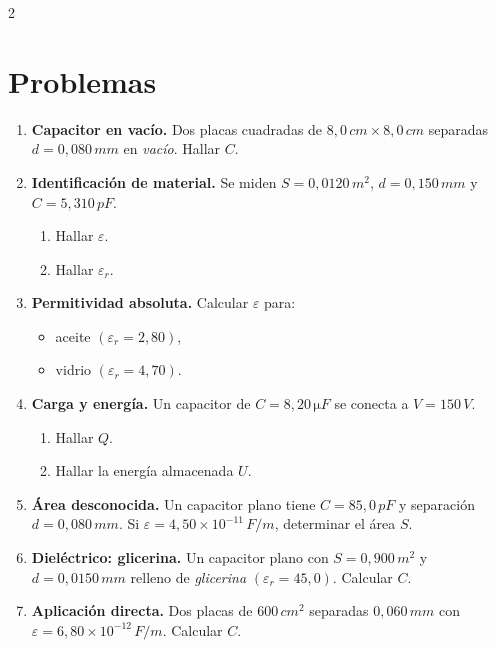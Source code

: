 \documentclass[a4paper,10pt]{article}
\begin{document}
\begin{multicols}{2}

\section*{Problemas}

\begin{enumerate}
\item \textbf{Capacitor en vacío.} Dos placas cuadradas de \(8,0\,\si{cm} \times 8,0\,\si{cm}\) separadas \(d=0,080\,\si{mm}\) en \textit{vacío}. Hallar \(C\).

\item \textbf{Identificación de material.} Se miden \(S=0,0120\,\si{m^2}\), \(d=0,150\,\si{mm}\) y \(C=5,310\,\si{pF}\).
\begin{enumerate}
\item Hallar \(\varepsilon\).
\item Hallar \(\varepsilon_r\).
\end{enumerate}

\item \textbf{Permitividad absoluta.} Calcular \(\varepsilon\) para:
\begin{itemize}
\item aceite \(\left(\varepsilon_r=2,80\right)\),
\item vidrio \(\left(\varepsilon_r=4,70\right)\).
\end{itemize}

\item \textbf{Carga y energía.} Un capacitor de \(C=8,20\,\si{\micro F}\) se conecta a \(V=150\,\si{V}\).
\begin{enumerate}
\item Hallar \(Q\).
\item Hallar la energía almacenada \(U\).
\end{enumerate}

\item \textbf{Área desconocida.} Un capacitor plano tiene \(C=85,0\,\si{pF}\) y separación \(d=0,080\,\si{mm}\). Si \(\varepsilon=4,50\times 10^{-11}\,\si{F/m}\), determinar el área \(S\).

\item \textbf{Dieléctrico: glicerina.} Un capacitor plano con \(S=0,900\,\si{m^2}\) y \(d=0,0150\,\si{mm}\) relleno de \textit{glicerina} \(\left(\varepsilon_r=45,0\right)\). Calcular \(C\).

\item \textbf{Aplicación directa.} Dos placas de \(600\,\si{cm^2}\) separadas \(0,060\,\si{mm}\) con \(\varepsilon=6,80\times 10^{-12}\,\si{F/m}\). Calcular \(C\).


\end{enumerate}
\end{multicols}
\end{document}
